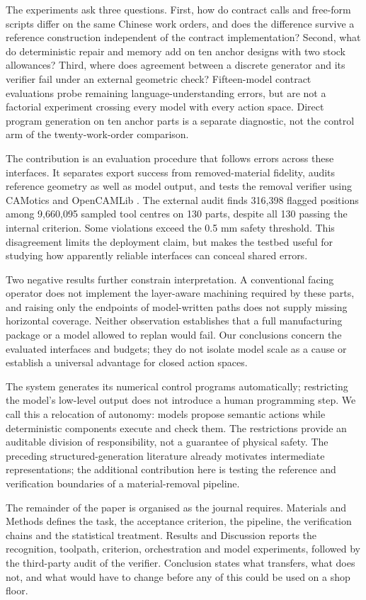 The experiments ask three questions. First, how do contract calls and free-form scripts differ on the same Chinese work orders, and does the difference survive a reference construction independent of the contract implementation? Second, what do deterministic repair and memory add on ten anchor designs with two stock allowances? Third, where does agreement between a discrete generator and its verifier fail under an external geometric check? Fifteen-model contract evaluations probe remaining language-understanding errors, but are not a factorial experiment crossing every model with every action space. Direct program generation on ten anchor parts is a separate diagnostic, not the control arm of the twenty-work-order comparison.

The contribution is an evaluation procedure that follows errors across these interfaces. It separates export success from removed-material fidelity, audits reference geometry as well as model output, and tests the removal verifier using CAMotics and OpenCAMLib \cite{CAMotics2020,OpenCAMLib2023}. The external audit finds 316,398 flagged positions among 9,660,095 sampled tool centres on 130 parts, despite all 130 passing the internal criterion. Some violations exceed the 0.5 mm safety threshold. This disagreement limits the deployment claim, but makes the testbed useful for studying how apparently reliable interfaces can conceal shared errors.

Two negative results further constrain interpretation. A conventional facing operator does not implement the layer-aware machining required by these parts, and raising only the endpoints of model-written paths does not supply missing horizontal coverage. Neither observation establishes that a full manufacturing package or a model allowed to replan would fail. Our conclusions concern the evaluated interfaces and budgets; they do not isolate model scale as a cause or establish a universal advantage for closed action spaces.

The system generates its numerical control programs automatically; restricting the model's low-level output does not introduce a human programming step. We call this a relocation of autonomy: models propose semantic actions while deterministic components execute and check them. The restrictions provide an auditable division of responsibility, not a guarantee of physical safety. The preceding structured-generation literature already motivates intermediate representations; the additional contribution here is testing the reference and verification boundaries of a material-removal pipeline.

The remainder of the paper is organised as the journal requires. Materials and Methods defines the task, the acceptance criterion, the pipeline, the verification chains and the statistical treatment. Results and Discussion reports the recognition, toolpath, criterion, orchestration and model experiments, followed by the third-party audit of the verifier. Conclusion states what transfers, what does not, and what would have to change before any of this could be used on a shop floor.
